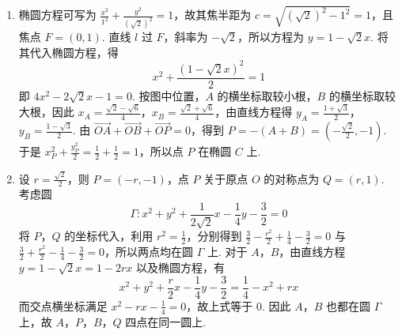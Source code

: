 \begin{solution}
\begin{enumerate}
\item 椭圆方程可写为 \(\frac{x^2}{1^2}+\frac{y^2}{(\sqrt{2})^2}=1\)，故其焦半距为 \(c=\sqrt{(\sqrt{2})^2-1^2}=1\)，且焦点 \(F=(0,1)\). 直线 \(l\) 过 \(F\)，斜率为 \(-\sqrt{2}\)，所以方程为 \(y=1-\sqrt{2}x\). 将其代入椭圆方程，得
\[
x^2+\frac{(1-\sqrt{2}x)^2}{2}=1
\]
即 \(4x^2-2\sqrt{2}x-1=0\). 按图中位置，\(A\) 的横坐标取较小根，\(B\) 的横坐标取较大根，因此
\(x_A=\frac{\sqrt{2}-\sqrt{6}}{4}\)，\(x_B=\frac{\sqrt{2}+\sqrt{6}}{4}\)，由直线方程得 \(y_A=\frac{1+\sqrt{3}}{2}\)，\(y_B=\frac{1-\sqrt{3}}{2}\). 由 \(\overrightarrow{OA}+\overrightarrow{OB}+\overrightarrow{OP}=0\)，得到 \(P=-(A+B)=(-\frac{\sqrt{2}}{2},-1)\). 于是
\(x_P^2+\frac{y_P^2}{2}=\frac{1}{2}+\frac{1}{2}=1\)，所以点 \(P\) 在椭圆 \(C\) 上.
\item 设 \(r=\frac{\sqrt{2}}{2}\)，则 \(P=(-r,-1)\)，点 \(P\) 关于原点 \(O\) 的对称点为 \(Q=(r,1)\). 考虑圆
\[
\Gamma:x^2+y^2+\frac{1}{2\sqrt{2}}x-\frac{1}{4}y-\frac{3}{2}=0
\]
将 \(P\)，\(Q\) 的坐标代入，利用 \(r^2=\frac12\)，分别得到 \(\frac32-\frac{r^2}{2}+\frac14-\frac32=0\) 与 \(\frac32+\frac{r^2}{2}-\frac14-\frac32=0\)，所以两点均在圆 \(\Gamma\) 上. 对于 \(A\)，\(B\)，由直线方程 \(y=1-\sqrt{2}x=1-2rx\) 以及椭圆方程，有
\[
x^2+y^2+\frac{r}{2}x-\frac14y-\frac32=\frac14-x^2+rx
\]
而交点横坐标满足 \(x^2-rx-\frac14=0\)，故上式等于 \(0\). 因此 \(A\)，\(B\) 也都在圆 \(\Gamma\) 上，故 \(A\)，\(P\)，\(B\)，\(Q\) 四点在同一圆上.
\end{enumerate}
\end{solution}
